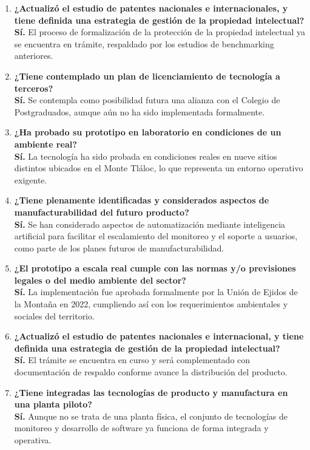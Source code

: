 \begin{enumerate}
\item \textbf{¿Actualizó el estudio de patentes nacionales e internacionales, y tiene definida una estrategia de gestión de la propiedad intelectual?} \\
\textbf{Sí.} El proceso de formalización de la protección de la propiedad intelectual ya se encuentra en trámite, respaldado por los estudios de benchmarking anteriores.

\item \textbf{¿Tiene contemplado un plan de licenciamiento de tecnología a terceros?} \\
\textbf{Sí.} Se contempla como posibilidad futura una alianza con el Colegio de Postgraduados, aunque aún no ha sido implementada formalmente.

\item \textbf{¿Ha probado su prototipo en laboratorio en condiciones de un ambiente real?} \\
\textbf{Sí.} La tecnología ha sido probada en condiciones reales en nueve sitios distintos ubicados en el Monte Tláloc, lo que representa un entorno operativo exigente.

\item \textbf{¿Tiene plenamente identificadas y considerados aspectos de manufacturabilidad del futuro producto?} \\
\textbf{Sí.} Se han considerado aspectos de automatización mediante inteligencia artificial para facilitar el escalamiento del monitoreo y el soporte a usuarios, como parte de los planes futuros de manufacturabilidad.

\item \textbf{¿El prototipo a escala real cumple con las normas y/o previsiones legales o del medio ambiente del sector?} \\
\textbf{Sí.} La implementación fue aprobada formalmente por la Unión de Ejidos de la Montaña en 2022, cumpliendo así con los requerimientos ambientales y sociales del territorio.

\item \textbf{¿Actualizó el estudio de patentes nacionales e internacional, y tiene definida una estrategia de gestión de la propiedad intelectual?} \\
\textbf{Sí.} El trámite se encuentra en curso y será complementado con documentación de respaldo conforme avance la distribución del producto.

\item \textbf{¿Tiene integradas las tecnologías de producto y manufactura en una planta piloto?} \\
\textbf{Sí.} Aunque no se trata de una planta física, el conjunto de tecnologías de monitoreo y desarrollo de software ya funciona de forma integrada y operativa.


\end{enumerate}
